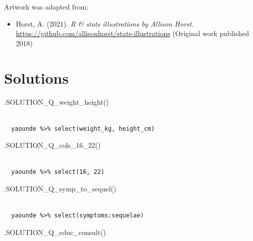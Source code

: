 \documentclass[
  letterpaper,
  DIV=11,
  numbers=noendperiod]{scrreprt}
\newenvironment{Shaded}{\begin{snugshade}}{\end{snugshade}}
\newcommand{\FunctionTok}[1]{\textcolor[rgb]{0.28,0.35,0.67}{#1}}
\newcommand{\NormalTok}[1]{\textcolor[rgb]{0.00,0.23,0.31}{#1}}
\providecommand{\tightlist}{%
  \setlength{\itemsep}{0pt}\setlength{\parskip}{0pt}}\usepackage{longtable,booktabs,array}
\begin{document}
Artwork was adapted from:

\begin{itemize}
\tightlist
\item
  Horst, A. (2021). \emph{R \& stats illustrations by Allison Horst}.
  \url{https://github.com/allisonhorst/stats-illustrations} (Original
  work published 2018)
\end{itemize}

\hypertarget{solutions-1}{%
\section{Solutions}\label{solutions-1}}

\begin{Shaded}
\begin{Highlighting}[]
\FunctionTok{.SOLUTION\_Q\_weight\_height}\NormalTok{()}
\end{Highlighting}
\end{Shaded}

\begin{verbatim}
 
  yaounde %>% select(weight_kg, height_cm)
\end{verbatim}

\begin{Shaded}
\begin{Highlighting}[]
\FunctionTok{.SOLUTION\_Q\_cols\_16\_22}\NormalTok{()}
\end{Highlighting}
\end{Shaded}

\begin{verbatim}
 
  yaounde %>% select(16, 22)
\end{verbatim}

\begin{Shaded}
\begin{Highlighting}[]
\FunctionTok{.SOLUTION\_Q\_symp\_to\_sequel}\NormalTok{()}
\end{Highlighting}
\end{Shaded}

\begin{verbatim}
 
  yaounde %>% select(symptoms:sequelae)
\end{verbatim}

\begin{Shaded}
\begin{Highlighting}[]
\FunctionTok{.SOLUTION\_Q\_educ\_consult}\NormalTok{()}
\end{Highlighting}
\end{Shaded}
\end{document}
